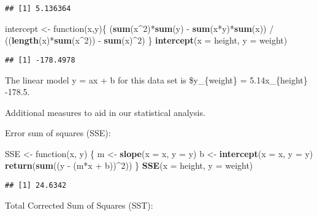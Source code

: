 \documentclass[]{article}
\newenvironment{Shaded}{\begin{snugshade}}{\end{snugshade}}
\newcommand{\KeywordTok}[1]{\textcolor[rgb]{0.13,0.29,0.53}{\textbf{{#1}}}}
\newcommand{\DataTypeTok}[1]{\textcolor[rgb]{0.13,0.29,0.53}{{#1}}}
\newcommand{\DecValTok}[1]{\textcolor[rgb]{0.00,0.00,0.81}{{#1}}}
\newcommand{\StringTok}[1]{\textcolor[rgb]{0.31,0.60,0.02}{{#1}}}
\newcommand{\NormalTok}[1]{{#1}}
\begin{document}
\begin{verbatim}
## [1] 5.136364
\end{verbatim}

\begin{Shaded}
\begin{Highlighting}[]
\NormalTok{intercept <-}\StringTok{ }\NormalTok{function(x,y)\{}
  \NormalTok{(}\KeywordTok{sum}\NormalTok{(x^}\DecValTok{2}\NormalTok{)*}\KeywordTok{sum}\NormalTok{(y) -}\StringTok{ }\KeywordTok{sum}\NormalTok{(x*y)*}\KeywordTok{sum}\NormalTok{(x)) /}
\StringTok{  }\NormalTok{((}\KeywordTok{length}\NormalTok{(x)*}\KeywordTok{sum}\NormalTok{(x^}\DecValTok{2}\NormalTok{)) -}\StringTok{ }\KeywordTok{sum}\NormalTok{(x)^}\DecValTok{2}\NormalTok{)}
\NormalTok{\}}
\KeywordTok{intercept}\NormalTok{(}\DataTypeTok{x =} \NormalTok{height, }\DataTypeTok{y =} \NormalTok{weight)}
\end{Highlighting}
\end{Shaded}

\begin{verbatim}
## [1] -178.4978
\end{verbatim}

The linear model y = ax + b for this data set is \$y\_\{weight\} =
5.14x\_\{height\} -178.5.

Additional measures to aid in our statistical analysis.

Error sum of squares (SSE):

\begin{Shaded}
\begin{Highlighting}[]
\NormalTok{SSE <-}\StringTok{ }\NormalTok{function(x, y) \{}
    \NormalTok{m <-}\StringTok{ }\KeywordTok{slope}\NormalTok{(}\DataTypeTok{x =} \NormalTok{x, }\DataTypeTok{y =} \NormalTok{y)}
    \NormalTok{b <-}\StringTok{ }\KeywordTok{intercept}\NormalTok{(}\DataTypeTok{x =} \NormalTok{x, }\DataTypeTok{y =} \NormalTok{y)}
    \KeywordTok{return}\NormalTok{(}\KeywordTok{sum}\NormalTok{((y -}\StringTok{ }\NormalTok{(m*x +}\StringTok{ }\NormalTok{b))^}\DecValTok{2}\NormalTok{))}
\NormalTok{\}}
\KeywordTok{SSE}\NormalTok{(}\DataTypeTok{x =} \NormalTok{height, }\DataTypeTok{y =} \NormalTok{weight)}
\end{Highlighting}
\end{Shaded}

\begin{verbatim}
## [1] 24.6342
\end{verbatim}

Total Corrected Sum of Squares (SST):
\end{document}
